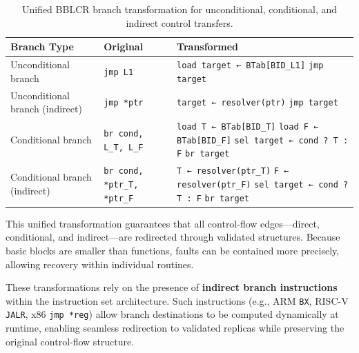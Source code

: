 \begin{table}[h!]
  \centering
  \renewcommand{\arraystretch}{1.2}
  \begin{tabularx}{\linewidth}{|l|X|X|}
    \hline
    \textbf{Branch Type} & \textbf{Original} & \textbf{Transformed} \\ \hline
    Unconditional branch &
    \texttt{jmp L1} &
    \texttt{load target ← BTab[BID\_L1]} \newline
    \texttt{jmp target} \\ \hline

    Unconditional branch (indirect) &
    \texttt{jmp *ptr} &
    \texttt{target ← resolver(ptr)} \newline
    \texttt{jmp target} \\ \hline

    Conditional branch &
    \texttt{br cond, L\_T, L\_F} &
    \texttt{load T ← BTab[BID\_T]} \newline
    \texttt{load F ← BTab[BID\_F]} \newline
    \texttt{sel target ← cond ? T : F} \newline
    \texttt{br target} \\ \hline

    Conditional branch (indirect) &
    \texttt{br cond, *ptr\_T, *ptr\_F} &
    \texttt{T ← resolver(ptr\_T)} \newline
    \texttt{F ← resolver(ptr\_F)} \newline
    \texttt{sel target ← cond ? T : F} \newline
    \texttt{br target} \\ \hline
  \end{tabularx}
  \caption{Unified BBLCR branch transformation for unconditional, conditional,
           and indirect control transfers.}
  \label{tab:bblcr-transform}
\end{table}

This unified transformation guarantees that all control-flow edges—direct, conditional,
and indirect—are redirected through validated structures.
Because basic blocks are smaller than functions, faults can be contained more precisely,
allowing recovery within individual routines.

These transformations rely on the presence of \textbf{indirect branch instructions}
within the instruction set architecture.
Such instructions (e.g., ARM \texttt{BX}, RISC-V \texttt{JALR}, x86 \texttt{jmp *reg})
allow branch destinations to be computed dynamically at runtime, enabling seamless
redirection to validated replicas while preserving the original control-flow structure.

